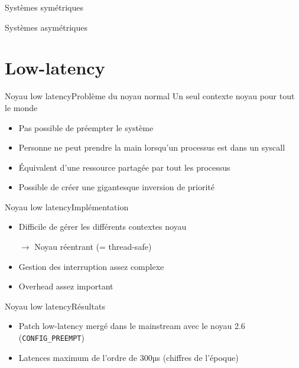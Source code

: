 \begin{frame}{Systèmes symétriques}
\end{frame} 

\begin{frame}{Systèmes asymétriques}
\end{frame} 

\section{Low-latency}

\begin{frame}{Noyau low latency}{Problème du noyau normal} %
 Un seul contexte noyau pour tout le monde
 \begin{itemize}
  \item Pas possible de préempter le système
  \item Personne ne peut prendre la main lorsqu'un processus est dans un syscall
  \item Équivalent d'une ressource partagée par tout les processus
  \item Possible de créer une gigantesque inversion de priorité
 \end{itemize}
\end{frame}

\begin{frame}{Noyau low latency}{Implémentation} %
 \begin{itemize}
  \item Difficile de gérer les différents contextes noyau
  \item[$\to$] Noyau réentrant (= thread-safe)
  \item Gestion des interruption assez complexe
  \item Overhead assez important
 \end{itemize}
\end{frame}

\begin{frame}{Noyau low latency}{Résultats} %
 \begin{itemize}
   \item Patch low-latency mergé dans le mainstream avec le noyau 2.6 (\texttt{CONFIG\_PREEMPT})
   \item Latences maximum de l'ordre de 300µs (chiffres de l'époque)
 \end{itemize}
\end{frame}

